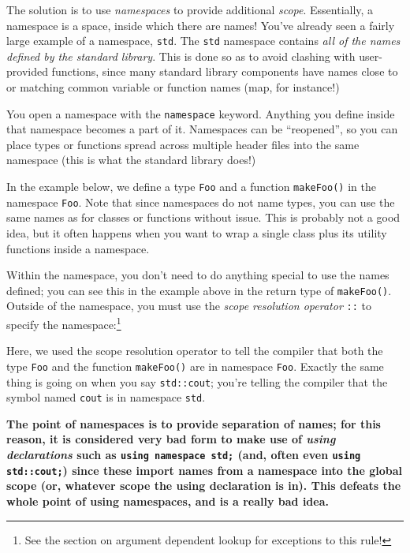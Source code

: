 \documentclass[a4paper]{scrartcl}
\begin{document}
The solution is to use \emph{namespaces} to provide additional \emph{scope}. Essentially, a namespace is a space, inside which there are names! You've already seen a fairly large example of a namespace, \verb|std|. The \verb|std| namespace contains \emph{all of the names defined by the standard library}. This is done so as to avoid clashing with user-provided functions, since many standard library components have names close to or matching common variable or function names (map, for instance!)

You open a namespace with the \verb|namespace| keyword. Anything you define inside that namespace becomes a part of it. Namespaces can be ``reopened'', so you can place types or functions spread across multiple header files into the same namespace (this is what the standard library does!)

In the example below, we define a type \verb|Foo| and a function \verb|makeFoo()| in the namespace \verb|Foo|. Note that since namespaces do not name types, you can use the same names as for classes or functions without issue. This is probably not a good idea, but it often happens when you want to wrap a single class plus its utility functions inside a namespace.



Within the namespace, you don't need to do anything special to use the names defined; you can see this in the example above in the return type of \verb|makeFoo()|. Outside of the namespace, you must use the \emph{scope resolution operator} \verb|::| to specify the namespace:\footnote{See the section on argument dependent lookup for exceptions to this rule!}



Here, we used the scope resolution operator to tell the compiler that both the type \verb|Foo| and the function \verb|makeFoo()| are in namespace \verb|Foo|. Exactly the same thing is going on when you say \verb|std::cout|; you're telling the compiler that the symbol named \verb|cout| is in namespace \verb|std|.

\textbf{The point of namespaces is to provide separation of names; for this reason, it is considered very bad form to make use of \emph{using declarations} such as \texttt{using namespace std;} (and, often even \texttt{using std::cout;}) since these import names from a namespace into the global scope (or, whatever scope the using declaration is in). This defeats the whole point of using namespaces, and is a {\sc really bad idea}.}
\end{document}
